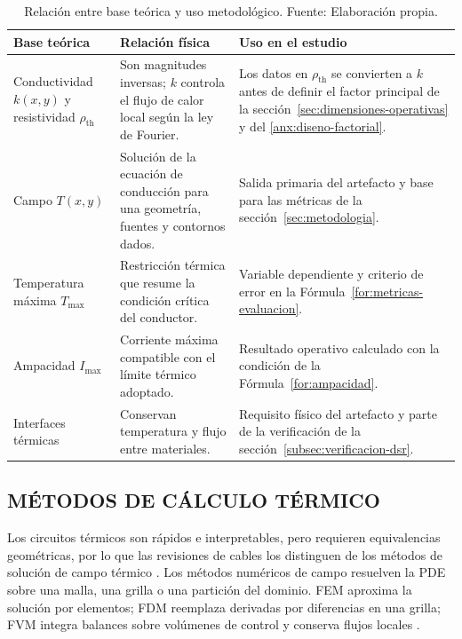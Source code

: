 \documentclass[11pt,a4paper,oneside]{report}
\renewcommand{\arraystretch}{1.18}
\newcommand{\Tmax}{T_{\max}}
\newcommand{\Imax}{I_{\max}}
\newcommand{\kx}{k(x,y)}
\newcommand{\rhoth}{\rho_{\mathrm{th}}}
\begin{document}
\begin{table}[htbp]
\centering
\caption{Relación entre base teórica y uso metodológico. Fuente: Elaboración propia.}
\label{tab:base-teorica-uso}
\begingroup
\footnotesize
\setlength{\tabcolsep}{3pt}
\renewcommand{\arraystretch}{1.25}
\begin{tabularx}{\textwidth}{L{3.2cm}Y Y}
\toprule
\textbf{Base teórica} & \textbf{Relación física} & \textbf{Uso en el estudio} \\
\midrule
Conductividad $\kx$ y resistividad $\rhoth$ & Son magnitudes inversas; $k$ controla el flujo de calor local según la ley de Fourier. & Los datos en $\rhoth$ se convierten a $k$ antes de definir el factor principal de la sección~\ref{sec:dimensiones-operativas} y del \ref{anx:diseno-factorial}. \\
Campo $T(x,y)$ & Solución de la ecuación de conducción para una geometría, fuentes y contornos dados. & Salida primaria del artefacto y base para las métricas de la sección~\ref{sec:metodologia}. \\
Temperatura máxima $\Tmax$ & Restricción térmica que resume la condición crítica del conductor. & Variable dependiente y criterio de error en la Fórmula~\ref{for:metricas-evaluacion}. \\
Ampacidad $\Imax$ & Corriente máxima compatible con el límite térmico adoptado. & Resultado operativo calculado con la condición de la Fórmula~\ref{for:ampacidad}. \\
Interfaces térmicas & Conservan temperatura y flujo entre materiales. & Requisito físico del artefacto y parte de la verificación de la sección~\ref{subsec:verificacion-dsr}. \\
\bottomrule
\end{tabularx}
\endgroup
\end{table}

\subsection{MÉTODOS DE CÁLCULO TÉRMICO}
\label{subsec:metodos-calculo-termico}

Los circuitos térmicos son rápidos e interpretables, pero requieren equivalencias geométricas, por lo que las revisiones de cables los distinguen de los métodos de solución de campo térmico \parencite[4--6]{enescu2021}. Los métodos numéricos de campo resuelven la PDE sobre una malla, una grilla o una partición del dominio. FEM aproxima la solución por elementos; FDM reemplaza derivadas por diferencias en una grilla; FVM integra balances sobre volúmenes de control y conserva flujos locales \parencites{patankar1980numerical}[3--4,93--99]{cigre2025}.
\end{document}
